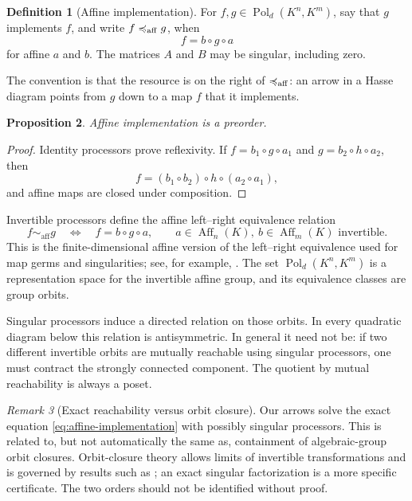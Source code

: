 \documentclass[11pt]{article}
\theoremstyle{definition}
\newtheorem{definition}{Definition}[section]
\theoremstyle{plain}
\newtheorem{proposition}[definition]{Proposition}
\theoremstyle{remark}
\newtheorem{remark}[definition]{Remark}
\newcommand{\Aff}{\operatorname{Aff}}
\newcommand{\Pol}{\operatorname{Pol}}
\newcommand{\impl}{\preccurlyeq}
\newcommand{\simaff}{\sim_{\mathrm{aff}}}
\begin{document}
\begin{definition}[Affine implementation]
For \(f,g\in\Pol_d(K^n,K^m)\), say that \(g\) implements \(f\), and write
\(f\impl_{\rm aff}g\), when
\begin{equation}
  f=b\circ g\circ a
  \label{eq:affine-implementation}
\end{equation}
for affine \(a\) and \(b\).  The matrices \(A\) and \(B\) may be singular,
including zero.
\end{definition}

The convention is that the resource is on the right of \(\impl_{\rm aff}\):
an arrow in a Hasse diagram points from \(g\) down to a map \(f\) that it
implements.

\begin{proposition}
Affine implementation is a preorder.
\end{proposition}

\begin{proof}
Identity processors prove reflexivity.  If
\(f=b_1\circ g\circ a_1\) and \(g=b_2\circ h\circ a_2\), then
\[
  f=(b_1\circ b_2)\circ h\circ(a_2\circ a_1),
\]
and affine maps are closed under composition.
\end{proof}

Invertible processors define the affine left--right equivalence relation
\begin{equation}
  f\simaff g
  \quad\Longleftrightarrow\quad
  f=b\circ g\circ a,
  \qquad a\in\Aff_n(K),\ b\in\Aff_m(K)
  \text{ invertible}.
  \label{eq:affine-equivalence}
\end{equation}
This is the finite-dimensional affine version of the left--right equivalence
used for map germs and singularities; see, for example,
\cite{kerner-left-right}.  The set \(\Pol_d(K^n,K^m)\) is a representation
space for the invertible affine group, and its equivalence classes are group
orbits.

Singular processors induce a directed relation on those orbits.  In every
quadratic diagram below this relation is antisymmetric.  In general it need
not be: if two different invertible orbits are mutually reachable using
singular processors, one must contract the strongly connected component.
The quotient by mutual reachability is always a poset.

\begin{remark}[Exact reachability versus orbit closure]
Our arrows solve the exact equation \eqref{eq:affine-implementation} with
possibly singular processors.  This is related to, but not automatically the
same as, containment of algebraic-group orbit closures.  Orbit-closure theory
allows limits of invertible transformations and is governed by results such
as \cite{birkes-orbits}; an exact singular factorization is a more specific
certificate.  The two orders should not be identified without proof.
\end{remark}
\end{document}
